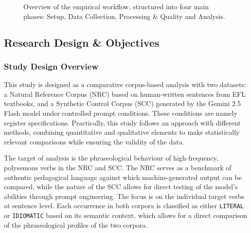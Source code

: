 \documentclass[11pt,a4paper]{article}
\begin{document}
\begin{figure}[H]
{%
} %
\caption[Methodology Workflow]{Overview of the empirical workflow, structured into four main phases: Setup, Data Collection, Processing \& Quality and Analysis.}
\label{fig:methodology-workflow}
\end{figure}

\subsection{Research Design \& Objectives}\label{subsec:research-design}

\subsubsection{Study Design Overview}\label{subsubsec:study-design}

This study is designed as a comparative corpus-based analysis with two datasets: a Natural Reference Corpus (NRC) based on human-written sentences from EFL textbooks, and a Synthetic Control Corpus (SCC) generated by the Gemini 2.5 Flash model under controlled prompt conditions. These conditions are namely register specifications. Practically, this study follows an approach with different methods, combining quantitative and qualitative elements to make statistically relevant comparisons while ensuring the validity of the data. 

The target of analysis is the phraseological behaviour of high-frequency, polysemous verbs in the NRC and SCC. The NRC serves as a benchmark of authentic pedagogical language against which machine-generated output can be compared, while the nature of the SCC allows for direct testing of the model's abilities through prompt engineering. The focus is on the individual target verbs at sentence level. Each occurrence in both corpora is classified as either \texttt{LITERAL} or \texttt{IDIOMATIC} based on its semantic context, which allows for a direct comparison of the phraseological profiles of the two corpora. 
\end{document}
